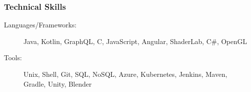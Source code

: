 \documentclass{article}
\begin{document}

\subsubsection*{Technical Skills}
    \begin{description}    
        \item[Languages/Frameworks:] 
            Java, 
            Kotlin,
            GraphQL,
            C,
            JavaScript,
            Angular,
            ShaderLab, 
            C\#,
            OpenGL

            \vspace{0.5em}

        \item[Tools:] 
            Unix,
            Shell,
            Git,
            SQL,
            NoSQL,
            Azure,
            Kubernetes,
            Jenkins,
            Maven,
            Gradle,
            Unity,
            Blender
    \end{description}
\end{document}
